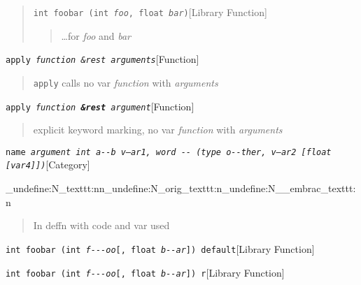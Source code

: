 \documentclass{book}
\begin{document}
\begin{quote}
\noindent\texttt{int foobar (int \textsl{foo}, float \textsl{bar})}\hfill[Library Function]



%
\begin{quote}
\unskip{\parskip=0pt\noindent}%
\dots{}\@ for \textsl{foo} and \textsl{bar}
\end{quote}
\end{quote}

\noindent\texttt{apply \EmbracOn{}\textnormal{\textsl{function \&rest arguments}}\EmbracOff{}}\hfill[Function]



%
\begin{quote}
\unskip{\parskip=0pt\noindent}%
\texttt{apply} calls no var \textsl{function} with \textsl{arguments}
\end{quote}

\noindent\texttt{apply \EmbracOn{}\textnormal{\textsl{function \EmbracOff{}\textnormal{\textbf{\&rest}}\EmbracOn{} argument}}\EmbracOff{}}\hfill[Function]



%
\begin{quote}
\unskip{\parskip=0pt\noindent}%
explicit keyword marking, no var \textsl{function} with \textsl{arguments}
\end{quote}

\noindent\texttt{name \EmbracOn{}\textnormal{\textsl{argument \texttt{int} \texttt{a{-}{-}b} \textsl{v--ar1}, word \texttt{{-}{-}} (\texttt{type o{-}{-}ther}, \textsl{v---ar2}  [\texttt{float} [\textsl{var4}]])}}\EmbracOff{}}\hfill[Category]


\ExplSyntaxOn%
\cs_undefine:N{\embrac_texttt:nn}\cs_undefine:N{\embrac_orig_texttt:n}\cs_undefine:N{\__embrac_texttt:n}%
\ExplSyntaxOff%
%
\begin{quote}
\unskip{\parskip=0pt\noindent}%
In deffn with code and var used
\end{quote}

\noindent\texttt{int foobar (int \textsl{f{-}{-}{-}oo}[, float \textsl{b{-}{-}ar}]) default}\hfill[Library Function]



%
\noindent\texttt{int foobar (int \textsl{f{-}{-}{-}oo}\textnormal{[}, float \textsl{b{-}{-}ar}\textnormal{]}) r}\hfill[Library Function]
\end{document}
